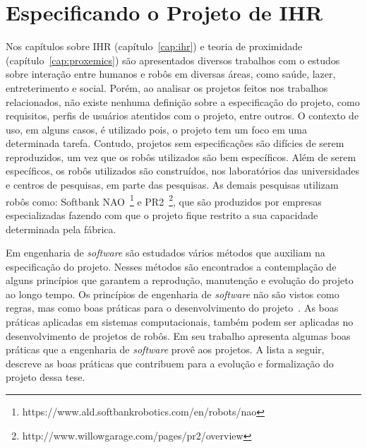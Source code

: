\section{Especificando o Projeto de IHR}
\label{sec:projetoihr}
Nos capítulos sobre IHR (capítulo~\ref{cap:ihr}) e teoria de proximidade (capítulo~\ref{cap:proxemics}) são apresentados diversos trabalhos com o estudos sobre interação entre humanos e robôs em diversas áreas, como saúde, lazer, entreterimento e social. Porém, ao analisar os projetos feitos nos trabalhos relacionados, não existe nenhuma definição sobre a especificação do projeto, como requisitos, perfis de usuários atentidos com o projeto, entre outros. O contexto de uso, em alguns casos, é utilizado pois, o projeto tem um foco em uma determinada tarefa. Contudo, projetos sem especificações são difícies de serem reproduzidos, um vez que os robôs utilizados são bem específicos. Além de serem específicos, os robôs utilizados são construídos, nos laboratórios das universidades e centros de pesquisas, em parte das pesquisas. As demais pesquisas utilizam robôs como: Softbank NAO~\footnote{https://www.ald.softbankrobotics.com/en/robots/nao} e PR2~\footnote{http://www.willowgarage.com/pages/pr2/overview}, que são produzidos por empresas especializadas fazendo com que o projeto fique restrito a sua capacidade determinada pela fábrica.

Em engenharia de \emph{software} são estudados vários métodos que auxiliam na especificação do projeto. Nesses métodos são encontrados a contemplação de alguns princípios que garantem a reprodução, manutenção e evolução do projeto ao longo tempo. Os princípios de engenharia de \emph{software} não são vistos como regras, mas como boas práticas para o desenvolvimento do projeto~\cite{wazlawick:2013}. As boas práticas aplicadas em sistemas computacionais, também podem ser aplicadas no desenvolvimento de projetos de robôs. Em seu trabalho  apresenta algumas boas práticas que a engenharia de \emph{software} provê aos projetos. A lista a seguir, descreve as boas práticas que contribuem para a evolução e formalização do projeto dessa tese.

